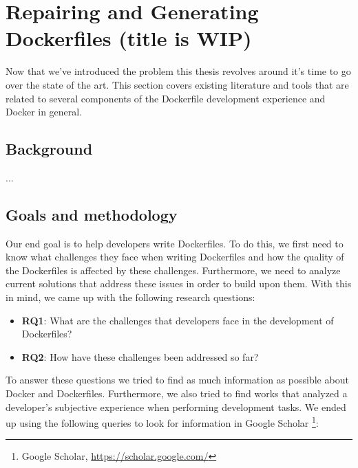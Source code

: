 \chapter{Repairing and Generating Dockerfiles (title is WIP)} \label{chap:sota}

Now that we've introduced the problem this thesis revolves around it's time to go over the state of the art.
This section covers existing literature and tools that are related to several components of the Dockerfile development experience and Docker in general.


\section{Background} \label{sec:background}
...

\section{Goals and methodology} \label{sec:goals_and_methodology}

Our end goal is to help developers write Dockerfiles. To do this, we first need to know what challenges they face when writing Dockerfiles and how the quality of the Dockerfiles is affected by these challenges. Furthermore, we need to analyze current solutions that address these issues in order to build upon them. With this in mind, we came up with the following research questions:

\begin{itemize}
    \item \textbf{RQ1}: What are the challenges that developers face in the development of Dockerfiles?
    \item \textbf{RQ2}: How have these challenges been addressed so far?
\end{itemize}

To answer these questions we tried to find as much information as possible about Docker and Dockerfiles. Furthermore, we also tried to find works that analyzed a developer's subjective experience when performing development tasks. We ended up using the following queries to look for information in Google Scholar \footnote{Google Scholar, \url{https://scholar.google.com/}}:

